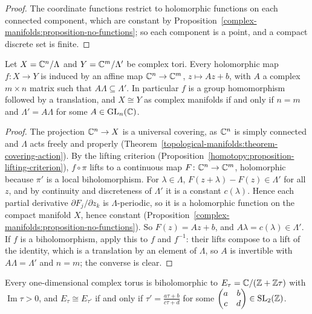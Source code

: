 \begin{proof}
The coordinate functions restrict to holomorphic functions on each connected component, which are constant by Proposition~\ref{complex-manifolds:proposition-no-functions}; so each component is a point, and a compact discrete set is
finite.
\end{proof}

\begin{theorem}\label{complex-manifolds:theorem-maps-of-tori}
Let $X = \mathbb{C}^n/\Lambda$ and $Y = \mathbb{C}^m/\Lambda'$ be complex tori. Every holomorphic map $f \colon X \to Y$ is induced by an affine map $\mathbb{C}^n \to \mathbb{C}^m$, $z \mapsto Az + b$, with $A$ a complex $m \times n$ matrix such that
$A\Lambda \subseteq \Lambda'$. In particular $f$ is a group homomorphism followed by a translation, and $X \cong Y$ as complex manifolds if and only if $n = m$ and $\Lambda' = A\Lambda$ for some $A \in \mathrm{GL}_n(\mathbb{C})$.
\end{theorem}

\begin{proof}
The projection $\mathbb{C}^n \to X$ is a universal covering, as $\mathbb{C}^n$ is simply connected and $\Lambda$ acts freely and properly (Theorem~\ref{topological-manifolds:theorem-covering-action}). By the lifting criterion
(Proposition~\ref{homotopy:proposition-lifting-criterion}), $f \circ \pi$ lifts to a continuous map $F \colon \mathbb{C}^n \to \mathbb{C}^m$, holomorphic because $\pi'$ is a local biholomorphism. For $\lambda \in \Lambda$, $F(z + \lambda) - F(z) \in \Lambda'$ for all
$z$, and by continuity and discreteness of $\Lambda'$ it is a constant $c(\lambda)$. Hence each partial derivative $\partial F_j/\partial z_k$ is $\Lambda$-periodic, so it is a holomorphic function on the compact manifold $X$, hence constant
(Proposition~\ref{complex-manifolds:proposition-no-functions}). So $F(z) = Az + b$, and $A\lambda = c(\lambda) \in \Lambda'$. If $f$ is a biholomorphism, apply this to $f$ and $f^{-1}$: their lifts compose to a lift of the identity, which is
a translation by an element of $\Lambda$, so $A$ is invertible with $A\Lambda = \Lambda'$ and $n = m$; the converse is clear.
\end{proof}

\begin{corollary}\label{complex-manifolds:corollary-elliptic-curves}
Every one-dimensional complex torus is biholomorphic to $E_\tau = \mathbb{C}/(\mathbb{Z} + \mathbb{Z}\tau)$ with $\operatorname{Im}\tau > 0$, and $E_\tau \cong E_{\tau'}$ if and only if $\tau' = \frac{a\tau + b}{c\tau + d}$ for some
$\begin{pmatrix}a & b\\ c & d\end{pmatrix} \in \mathrm{SL}_2(\mathbb{Z})$.
\end{corollary}

